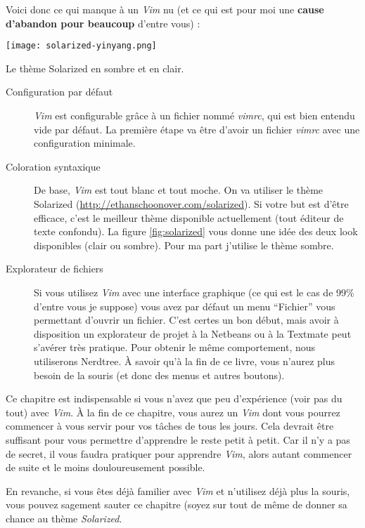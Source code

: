 Voici donc ce qui manque à un \emph{Vim} nu (et ce qui est pour moi une \textbf{cause d'abandon pour beaucoup} d'entre vous) :

\begin{marginfigure}%
  \texttt{[image: solarized-yinyang.png]}
  \caption{Le thème Solarized en sombre et en clair.}
  \label{fig:solarized}
\end{marginfigure}

\begin{description}
    \item[Configuration par défaut] \emph{Vim} est configurable grâce à un fichier nommé \emph{vimrc}, qui est bien entendu vide par défaut. La première étape va être d'avoir un fichier \emph{vimrc} avec une configuration minimale.
    \item[Coloration syntaxique] De base, \emph{Vim} est tout blanc et tout moche. On va utiliser le thème Solarized (\url{http://ethanschoonover.com/solarized}). Si votre but est d'être efficace, c'est le meilleur thème disponible actuellement (tout éditeur de texte confondu). La figure \ref{fig:solarized} vous donne une idée des deux look disponibles (clair ou sombre). Pour ma part j'utilise le thème sombre.
    \item[Explorateur de fichiers] Si vous utilisez \emph{Vim} avec une interface graphique (ce qui est le cas de 99\% d'entre vous je suppose) vous avez par défaut un menu ``Fichier'' vous permettant d'ouvrir un fichier. C'est certes un bon début, mais avoir à disposition un explorateur de projet à la Netbeans ou à la Textmate peut s'avérer très pratique. Pour obtenir le même comportement, nous utiliserons Nerdtree. À savoir qu'à la fin de ce livre, vous n'aurez plus besoin de la souris (et donc des menus et autres boutons).
\end{description}

Ce chapitre est indispensable si vous n'avez que peu d'expérience (voir pas du tout) avec \emph{Vim}. À la fin de ce chapitre, vous aurez un \emph{Vim} dont vous pourrez commencer à vous servir pour vos tâches de tous les jours. Cela devrait être suffisant pour vous permettre d'apprendre le reste petit à petit. Car il n'y a pas de secret, il vous faudra pratiquer pour apprendre \emph{Vim}, alors autant commencer de suite et le moins douloureusement possible.

En revanche, si vous êtes déjà familier avec \emph{Vim} et n'utilisez déjà plus la souris, vous pouvez sagement sauter ce chapitre (soyez sur tout de même de donner sa chance au thème \emph{Solarized}.


